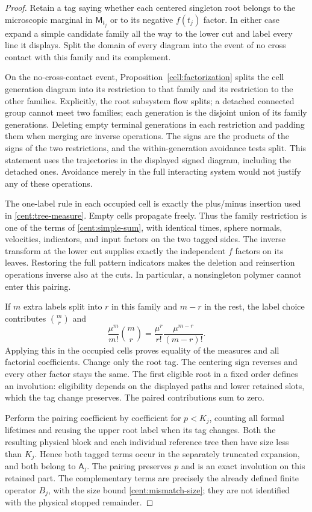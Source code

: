 \begin{proof}
Retain a tag saying whether each centered singleton root belongs to
the microscopic marginal in $\mathsf M_{t_j}$ or to its negative
$f(t_j)$ factor. In either case expand a simple candidate family all
the way to the lower cut and label every line it displays. Split the
domain of every diagram into the event of no cross contact with this
family and its complement.

On the no-cross-contact event, Proposition~\ref{cell:factorization}
splits the cell generation diagram into its restriction to that
family and its restriction to the other families. Explicitly, the
root subsystem flow splits; a detached connected group cannot meet
two families; each generation is the disjoint union of its family
generations. Deleting empty terminal generations in each restriction
and padding them when merging are inverse operations. The signs are
the products of the signs of the two restrictions, and the
within-generation avoidance tests split. This statement uses the
trajectories in the displayed signed diagram, including the detached
ones. Avoidance merely in the full interacting system would not
justify any of these operations.

The one-label rule in each occupied cell is exactly the plus/minus
insertion used in \eqref{cent:tree-measure}. Empty cells propagate
freely. Thus the family restriction is one of the terms of
\eqref{cent:simple-sum}, with identical times, sphere normals,
velocities, indicators, and input factors on the two tagged sides.
The inverse transform at the lower cut supplies exactly the
independent $f$ factors on its leaves. Restoring the full pattern
indicators makes the deletion and reinsertion operations inverse
also at the cuts. In particular, a nonsingleton polymer cannot enter
this pairing.

If $m$ extra labels split into $r$ in this family and $m-r$ in the
rest, the label choice contributes $\binom mr$ and
\[
 \frac{\mu^m}{m!}\binom mr
 =\frac{\mu^r}{r!}\frac{\mu^{m-r}}{(m-r)!}.
\]
Applying this in the occupied cells proves equality of the measures
and all factorial coefficients. Change only the root tag. The
centering sign reverses and every other factor stays the same.
The first eligible root in a fixed order defines an involution:
eligibility depends on the displayed paths and lower retained slots,
which the tag change preserves. The paired contributions sum to zero.

Perform the pairing coefficient by coefficient for $p<K_j$, counting
all formal lifetimes and reusing the upper root label when its tag
changes. Both the resulting physical block and each individual
reference tree then have size less than $K_j$. Hence both tagged
terms occur in the separately truncated expansion, and both belong
to $\mathsf A_j$. The pairing preserves $p$ and is an exact
involution on this retained part. The complementary terms are
precisely the already defined finite operator $B_j$, with the size
bound \eqref{cent:mismatch-size}; they are not identified with the
physical stopped remainder.
\end{proof}

